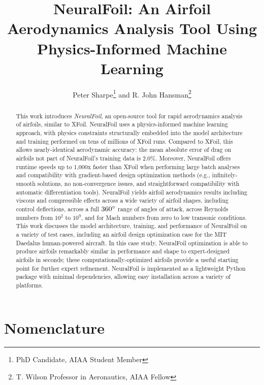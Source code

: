 \documentclass[conf]{new-aiaa}
\title{NeuralFoil: An Airfoil Aerodynamics Analysis Tool Using Physics-Informed Machine Learning}
\author{Peter Sharpe\footnote{PhD Candidate, AIAA Student Member} and R. John Hansman\footnote{T. Wilson Professor in Aeronautics, AIAA Fellow}}
\affil{Massachusetts Institute of Technology, Cambridge, MA}
\begin{document}
    \maketitle

    \begin{abstract}

        This work introduces \emph{NeuralFoil}, an open-source tool for rapid aerodynamics analysis of airfoils, similar to XFoil. NeuralFoil uses a physics-informed machine learning approach, with physics constraints structurally embedded into the model architecture and training performed on tens of millions of XFoil runs. Compared to XFoil, this allows nearly-identical aerodynamic accuracy: the mean absolute error of drag on airfoils not part of NeuralFoil's training data is 2.0\%. Moreover, NeuralFoil offers runtime speeds up to 1,000x faster than XFoil when performing large batch analyses and compatibility with gradient-based design optimization methods (e.g., infinitely-smooth solutions, no non-convergence issues, and straightforward compatibility with automatic differentiation tools). NeuralFoil yields airfoil aerodynamics results including viscous and compressible effects across a wide variety of airfoil shapes, including control deflections, across a full $360\degree$ range of angles of attack, across Reynolds numbers from $10^2$ to $10^9$, and for Mach numbers from zero to low transonic conditions. This work discusses the model architecture, training, and performance of NeuralFoil on a variety of test cases, including an airfoil design optimization case for the MIT Daedalus human-powered aircraft. In this case study, NeuralFoil optimization is able to produce airfoils remarkably similar in performance and shape to expert-designed airfoils in seconds; these computationally-optimized airfoils provide a useful starting point for further expert refinement. NeuralFoil is implemented as a lightweight Python package with minimal dependencies, allowing easy installation across a variety of platforms.

    \end{abstract}

    \section{Nomenclature}
\end{document}
